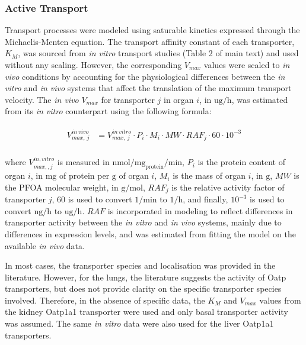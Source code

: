 \documentclass[preprint,12pt,authoryear]{elsarticle}
\begin{document}
\subsubsection{Active Transport}
Transport processes were modeled using saturable kinetics expressed through the Michaelis-Menten equation. The transport affinity constant of each transporter, $K_M$, was sourced from \textit{in vitro} transport studies (Table 2 of main text) and used without any scaling. However, the corresponding $V_{max}$ values were scaled to \textit{in vivo} conditions by accounting for the physiological differences between the \textit{in vitro} and \textit{in vivo} systems that affect the translation of the maximum transport velocity. The \textit{in vivo} $V_{max}$ for transporter $j$ in organ $i$, in $\text{ug}/\text{h}$, was estimated from its \textit{in vitro} counterpart using the following formula:

\begin{align}
\begin{aligned}
V_{max, \, j }^{in \,vivo} &= V_{max, \, j }^{in \,vitro}\cdot P_i \cdot M_i  \cdot MW \cdot RAF_j \cdot 60 \cdot 10^{-3} \\
\end{aligned} 
\end{align}

\noindent
where $V_{max, , j }^{in , vitro}$ is measured in $\text{nmol}/\text{mg}_{\text{protein}}/\text{min}$, $P_i$ is the protein content of organ $i$, in $\text{mg}$ of protein per $\text{g}$ of organ $i$, $M_i$ is the mass of organ $i$, in $\text{g}$, $MW$ is the PFOA molecular weight, in $\text{g}/\text{mol}$, $RAF_j$ is the relative activity factor of transporter $j$, $60$ is used to convert $1/\text{min}$ to $1/\text{h}$, and finally, $10^{-3}$ is used to convert $\text{ng}/\text{h}$ to $\text{ug}/\text{h}$. $RAF$ is incorporated in modeling to reflect differences in transporter activity between the \textit{in vitro} and \textit{in vivo} systems, mainly due to differences in expression levels, and was estimated from fitting the model on the available \textit{in vivo} data.


In most cases, the transporter species and localisation was provided in the literature. However, for the lungs, the literature suggests the activity of Oatp transporters, but does not provide clarity on the specific transporter species involved. Therefore, in the absence of specific data, the $K_M$ and $V_{max}$ values from the kidney Oatp1a1 transporter were used and only basal transporter activity was assumed. The same \textit{in vitro} data were also used for the liver Oatp1a1 transporters.
\end{document}
